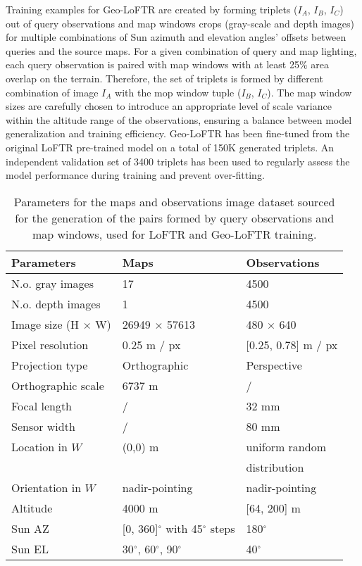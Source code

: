 Training examples for Geo-LoFTR are created by forming triplets ($I_A$, $I_B$, $I_C$) out of query observations and map windows crops (gray-scale and depth images) for multiple combinations of Sun azimuth and elevation angles' offsets between queries and the source maps. For a given combination of query and map lighting, each query observation is paired with map windows with at least 25\% area overlap on the terrain. Therefore, the set of triplets is formed by different combination of image $I_A$ with the mop window tuple ($I_B$, $I_C$). The map window sizes are carefully chosen to introduce an appropriate level of scale variance within the altitude range of the observations, ensuring a balance between model generalization and training efficiency. 
Geo-LoFTR has been fine-tuned from the original LoFTR pre-trained model on a total 
of 
150K
generated triplets. An independent validation set of 3400 triplets has been used to regularly assess the model performance during training and prevent over-fitting. 




\begin{table}
\centering
\begin{tabular}{l l l}
\textbf{Parameters} & \textbf{Maps} & \textbf{Observations} \\ \hline 
N.o. gray images & 17 & 4500 \\
N.o. depth images & 1 & 4500 \\
Image size (H $\times$ W) & 26949 $\times$ 57613  & 480 $\times$ 640  \\ 
Pixel resolution & 0.25 m / px  &  [0.25, 0.78] m / px \\
Projection type  & Orthographic & Perspective \\  
Orthographic scale & 6737 m & / \\
Focal length & / & 32 mm \\
Sensor width & / & 80 mm \\
Location in $W$ & (0,0) m &  uniform random \\
&  &  distribution \\
Orientation in $W$ & nadir-pointing & nadir-pointing \\
Altitude & 4000 m & [64, 200] m\\
Sun AZ   & [0, 360]$^{\circ}$ with 45$^{\circ}$ steps & 180$^{\circ}$ \\  
Sun EL & 30$^{\circ}$, 60$^{\circ}$, 90$^{\circ}$ & 40$^{\circ}$\\  
\end{tabular}
\caption{\label{tab:dataset_params} Parameters for the maps and observations image dataset sourced for the generation of the pairs formed by query observations and map windows, used for LoFTR and Geo-LoFTR training.}
\end{table}




